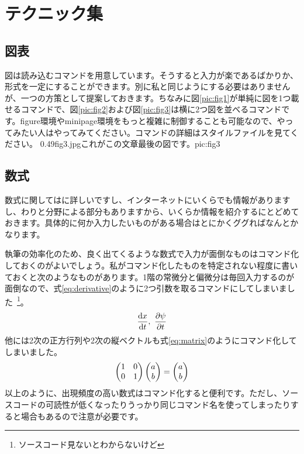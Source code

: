 \chapter{テクニック集}\label{cp:techniques}
\section{図表}
図は読み込むコマンドを用意しています。そうすると入力が楽であるばかりか、形式を一定にすることができます。別に私と同じようにする必要はありませんが、一つの方策として提案しておきます。ちなみに図\ref{pic:fig1}が単純に図を1つ載せるコマンドで、図\ref{pic:fig2}および図\ref{pic:fig3}は横に2つ図を並べるコマンドです。figure環境やminipage環境をもっと複雑に制御することも可能なので、やってみたい人はやってみてください。コマンドの詳細はスタイルファイルを見てください。
{0.49}{fig3.jpg}{これがこの文章最後の図です。}{pic:fig3}
\section{数式}
数式に関しては\cite{LaTeXbibunsho}に詳しいですし、インターネットにいくらでも情報がありますし、わりと分野による部分もありますから、いくらか情報を紹介するにとどめておきます。具体的に何か入力したいものがある場合はとにかくググればなんとかなります。

執筆の効率化のため、良く出てくるような数式で入力が面倒なものはコマンド化しておくのがよいでしょう。私がコマンド化したものを特定されない程度に書いておくと次のようなものがあります。1階の常微分と偏微分は毎回入力するのが面倒なので、式\ref{eq:derivative}のように2つ引数を取るコマンドにしてしまいました~\footnote{ソースコード見ないとわからないけど}。
\begin{align}\label{eq:derivative}
\frac{\mathrm{d}x}{\mathrm{d}t},~\frac{\partial\psi}{\partial t}
\end{align}
他には2次の正方行列や2次の縦ベクトルも式\ref{eq:matrix}のようにコマンド化してしまいました。
\begin{align}\label{eq:matrix}
\begin{pmatrix} 1 & 0 \\ 0 & 1 \end{pmatrix}
\begin{pmatrix} a \\ b \end{pmatrix}
=
\begin{pmatrix} a \\ b \end{pmatrix}
\end{align}%
以上のように、出現頻度の高い数式はコマンド化すると便利です。ただし、ソースコードの可読性が低くなったりうっかり同じコマンド名を使ってしまったりすると場合もあるので注意が必要です。
